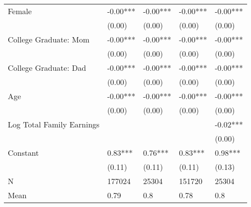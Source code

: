 \begin{ThreePartTable}
\begin{longtable}[c]{lllll}
Female & -0.00*** & -0.00*** & -0.00*** & -0.00***\\
 & (0.00) & (0.00) & (0.00) & \vphantom{3} (0.00)\\
College Graduate: Mom & -0.00*** & -0.00*** & -0.00*** & -0.00***\\
 & (0.00) & (0.00) & (0.00) & \vphantom{2} (0.00)\\
College Graduate: Dad & -0.00*** & -0.00*** & -0.00*** & -0.00***\\
\addlinespace
 & (0.00) & (0.00) & (0.00) & \vphantom{1} (0.00)\\
Age & -0.00*** & -0.00*** & -0.00*** & -0.00***\\
 & (0.00) & (0.00) & (0.00) & (0.00)\\
Log Total Family Earnings &  &  &  & -0.02***\\
 &  &  &  & (0.00)\\
\addlinespace
Constant & 0.83*** & 0.76*** & 0.83*** & 0.98***\\
\midrule
 & (0.11) & (0.11) & (0.11) & (0.13)\\
N & 177024 & 25304 & 151720 & 25304\\
Mean & 0.79 & 0.8 & 0.78 & 0.8\\*
\end{longtable}
\end{ThreePartTable}
